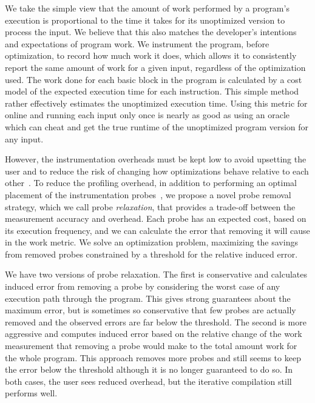     We take the simple view that the amount of work performed by a program's execution is proportional to the time it takes for its
    unoptimized version to process the input. We believe that this also matches the developer's intentions and expectations of program
    work. We instrument the program, before optimization, to record how much work it does, which allows it to consistently report the same
    amount of work for a given input, regardless of the optimization used. The work done for each basic block in the
    program is calculated by a cost model of the expected execution time for each instruction. This simple method rather effectively
    estimates the unoptimized execution time. Using this metric for online {\itercomp} and running each input only once is nearly as good
    as using an oracle which can cheat and get the true runtime of the unoptimized program version for any input.

    However, the instrumentation overheads must be kept low to avoid upsetting the user and to reduce the risk of changing how
    optimizations behave relative to each other~\cite{forman81,anderson97,duesterwald00}. To reduce the profiling overhead, in addition to
    performing an optimal placement of the instrumentation probes~\cite{knuth73,forman81,ball94}, we propose a novel probe removal
    strategy, which we call probe \textit{relaxation}, that provides a trade-off between the measurement accuracy and overhead. Each probe
    has an expected cost, based on its execution frequency, and we can calculate the error that removing it will cause in the work metric.
    We solve an optimization problem, maximizing the savings from removed probes constrained by a threshold for the relative induced error.

    We have two versions of probe relaxation. The first is conservative and calculates induced error from removing a probe by considering
    the worst case of any execution path through the program. This gives strong guarantees about the maximum error, but is sometimes so
    conservative that few probes are actually removed and the observed errors are far below the threshold. The second is more aggressive
    and computes induced error based on the relative change of the work measurement that removing a probe would make to the total amount
    work for the whole program. This approach removes more probes and still seems to keep the error below the threshold although it is no
    longer guaranteed to do so. In both cases, the user sees reduced overhead, but the iterative compilation still performs well.

